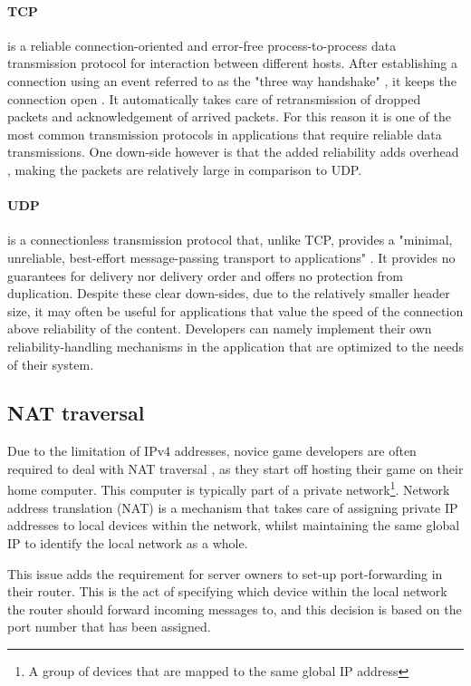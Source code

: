 \documentclass[bsc, 12pt, twoside, singlespacing, parskip, abbrevs, notimes, normalheadings, logo]{styles/infthesis}
\begin{document}
\paragraph*{TCP} is a reliable connection-oriented and error-free process-to-process data transmission protocol for interaction between different hosts. After establishing a connection using an event referred to as the "three way handshake" \cite{handshake}, it keeps the connection open \cite{tcp_open_connection}. It automatically takes care of retransmission of dropped packets and acknowledgement of arrived packets. For this reason it is one of the most common transmission protocols in applications that require reliable data transmissions. One down-side however is that the added reliability adds overhead \cite{Multiplayer_Networking_modern_engine}, making the packets are relatively large in comparison to UDP.

\paragraph*{UDP} is a connectionless transmission protocol that, unlike TCP, provides a "minimal, unreliable, best-effort message-passing transport to applications" \cite{udp_connectionless}. It provides no guarantees for delivery nor delivery order and offers no protection from duplication. Despite these clear down-sides, due to the relatively smaller header size, it may often be useful for applications that value the speed of the connection above reliability of the content. Developers can namely implement their own reliability-handling mechanisms in the application that are optimized to the needs of their system.

\subsection{NAT traversal}
Due to the limitation of IPv4 addresses, novice game developers are often required to deal with NAT traversal \cite{NAT}, as they start off hosting their game on their home computer. This computer is typically part of a private network\footnote{A group of devices that are mapped to the same global IP address}. Network address translation (NAT) is a mechanism that takes care of assigning private IP addresses to local devices within the network, whilst maintaining the same global IP to identify the local network as a whole.

This issue adds the requirement for server owners to set-up port-forwarding in their router. This is the act of specifying which device within the local network the router should forward incoming messages to, and this decision is based on the port number that has been assigned.
\end{document}
